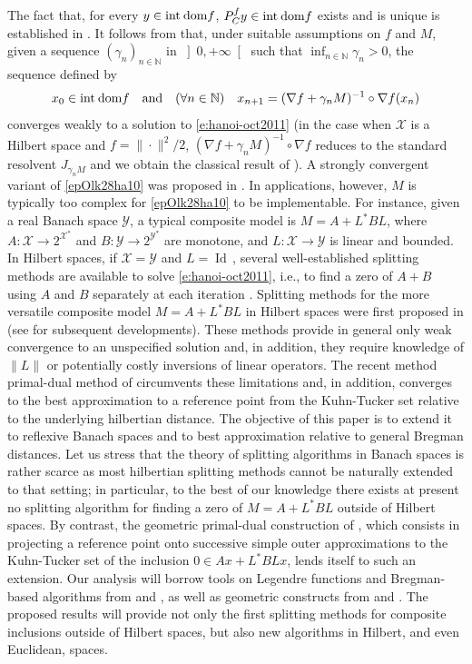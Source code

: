 \documentclass[a4paper,11pt,fleqn]{article}
\newcommand{\IDD}{\ensuremath{\text{\rm int\:dom}f}}
\newcommand{\XX}{\ensuremath{{\mathcal X}}}
\newcommand{\YY}{\ensuremath{{\mathcal Y}}}
\newcommand{\Id}{\ensuremath{\operatorname{Id}}\,}
\newcommand{\RPP}{\ensuremath{\left]0,+\infty\right[}}
\newcommand{\NN}{\ensuremath{\mathbb N}}
\theoremstyle{plain}{\theorembodyfont{\rmfamily}%
\newtheorem{conjecture}[theorem]{Conjecture}}
\theoremstyle{plain}{\theorembodyfont{\rmfamily}%
\newtheorem{example}[theorem]{Example}}
\theoremstyle{plain}{\theorembodyfont{\rmfamily}%
\newtheorem{remark}[theorem]{Remark}}
\theoremstyle{plain}{\theorembodyfont{\rmfamily}%
\newtheorem{algorithm}[theorem]{Algorithm}}
\theoremstyle{plain}{\theorembodyfont{\rmfamily}%
\newtheorem{condition}[theorem]{Condition}}
\theoremstyle{plain}{\theorembodyfont{\rmfamily}%
\newtheorem{definition}[theorem]{Definition}}
\theoremstyle{plain}{\theorembodyfont{\rmfamily}
\newtheorem{problem}[theorem]{Problem}}
\theoremstyle{plain}{\theorembodyfont{\rmfamily}
\newtheorem{notation}[theorem]{Notation}}
\numberwithin{equation}{section}
\begin{document}
The fact that, for every $y\in\IDD$, $P^f_Cy\in\IDD$ exists and is 
unique is established in \cite[Corollary~7.9]{Ccm01}.
It follows from \cite[Theorem~5.18]{Sico03} that, under suitable 
assumptions on $f$ and $M$, given a sequence $(\gamma_n)_{n\in\NN}$ 
in $\RPP$ such that $\inf_{n\in\NN}\gamma_n>0$, the sequence 
defined by
\begin{equation}
\label{epOlk28ha10}
x_0\in\IDD\quad\text{and}\quad(\forall n\in\NN)\quad
x_{n+1}=(\nabla f+\gamma_n M)^{-1}\circ\nabla f(x_n)
\end{equation}
converges weakly to a solution to \eqref{e:hanoi-oct2011} (in the
case when $\XX$ is a Hilbert space and $f=\|\cdot\|^2/2$, 
$(\nabla f+\gamma_n M)^{-1}\circ\nabla f$ reduces to the standard 
resolvent $J_{\gamma_n M}$ and we obtain
the classical result of \cite[Theorem~1]{Rock76}). A strongly
convergent variant of \eqref{epOlk28ha10} was proposed in 
\cite{Pams03}. In applications,
however, $M$ is typically too complex for \eqref{epOlk28ha10} to be
implementable. For instance, given a real Banach space $\YY$,
a typical composite model is 
$M=A+L^*BL$, where $A\colon\XX\to 2^{\XX^*}$ and 
$B\colon\YY\to 2^{\YY^*}$ are monotone, and $L\colon\XX\to\YY$ 
is linear and bounded. 
In Hilbert spaces, if $\XX=\YY$ and $L=\Id$, several 
well-established splitting methods are available to solve 
\eqref{e:hanoi-oct2011}, i.e., to find a zero of $A+B$ 
using $A$ and $B$ separately at each iteration
\cite{Livre1,Lion79,Merc79,Tsen00}. Splitting methods for the 
more versatile composite model $M=A+L^*BL$ in Hilbert spaces 
were first proposed in \cite{Siop11} (see 
\cite{Optl14,Bot13a,Bot13c,Siop13,Opti14,Bang13} for subsequent 
developments). These methods provide in general only weak 
convergence to an unspecified solution and, in addition, they 
require knowledge of
$\|L\|$ or potentially costly inversions of linear operators. 
The recent method primal-dual method of \cite{Nfao15} circumvents
these limitations and, in addition, converges to the best
approximation to a reference point from the Kuhn-Tucker set
relative to the underlying hilbertian distance. 
The objective of this paper is to extend it to
reflexive Banach spaces and to best approximation relative
to general Bregman distances. Let us stress that the theory of 
splitting algorithms in Banach spaces is rather scarce as most 
hilbertian splitting methods cannot be naturally extended to that
setting; in particular, to the best of our knowledge there exists 
at present no splitting algorithm for finding a zero of $M=A+L^*BL$ 
outside of Hilbert spaces. By contrast, the geometric primal-dual
construction of \cite{Nfao15}, which consists in projecting a 
reference point onto successive simple outer approximations to the 
Kuhn-Tucker set of the inclusion $0\in Ax+L^*BLx$, lends itself 
to such an extension. Our analysis will borrow tools on 
Legendre functions and Bregman-based algorithms from \cite{Ccm01} 
and \cite{Sico03}, as well as geometric constructs from 
\cite{Nfao15} and \cite{Pams03}. The proposed results will provide
not only the first splitting methods for composite inclusions 
outside of Hilbert spaces, but also new algorithms in Hilbert, 
and even Euclidean, spaces.
\end{document}
